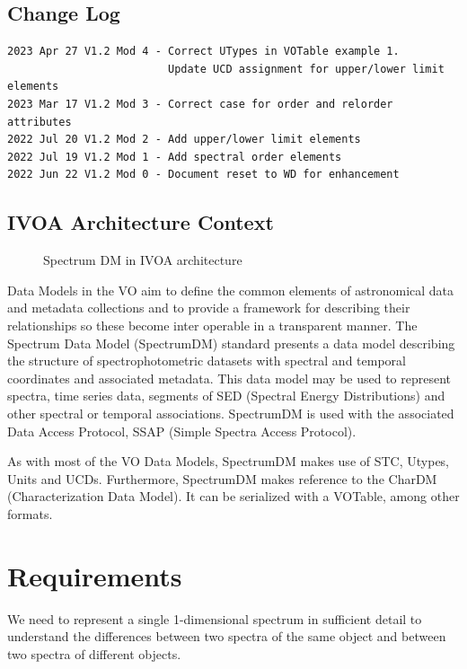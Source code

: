 \documentclass[11pt]{article}
\begin{document}
\subsection{Change Log}

\begin{verbatim}
2023 Apr 27 V1.2 Mod 4 - Correct UTypes in VOTable example 1.
                         Update UCD assignment for upper/lower limit elements
2023 Mar 17 V1.2 Mod 3 - Correct case for order and relorder attributes
2022 Jul 20 V1.2 Mod 2 - Add upper/lower limit elements
2022 Jul 19 V1.2 Mod 1 - Add spectral order elements
2022 Jun 22 V1.2 Mod 0 - Document reset to WD for enhancement
\end{verbatim}


\newpage
\subsection{IVOA Architecture Context}

\begin{figure}[h]

\colorbox{iblue}{
}
\caption{Spectrum DM in IVOA architecture}
\end{figure}

Data Models in the VO aim to define the common elements of astronomical data
and metadata collections and to provide a framework for describing their
relationships so these become inter operable in a transparent manner.
The Spectrum Data Model (SpectrumDM) standard presents a data model
describing the structure of spectrophotometric datasets with spectral and
temporal coordinates and associated metadata. This data model may be used to
represent spectra, time series data, segments of SED (Spectral Energy
Distributions) and other spectral or temporal associations. SpectrumDM is used
with the associated Data Access Protocol, SSAP (Simple Spectra Access 
Protocol).

As with most of the VO Data Models, SpectrumDM makes use of STC, Utypes,
Units and UCDs. Furthermore, SpectrumDM makes reference to the CharDM
(Characterization Data Model). It can be serialized with a VOTable, among
other formats.

\clearpage

\section{Requirements}

We need to represent a single 1-dimensional spectrum in sufficient
detail to understand the differences between two spectra of the same
object and between two spectra of different objects.
\end{document}

